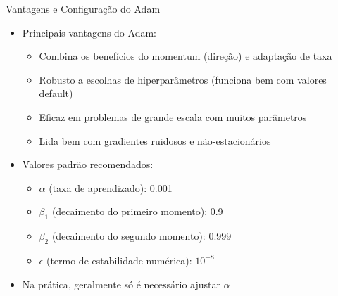 \documentclass[aspectratio=1610]{beamer}
\begin{document}
\begin{frame}{Vantagens e Configuração do Adam}
\begin{itemize}
    \item Principais vantagens do Adam: \pause
    \begin{itemize}
        \item Combina os benefícios do momentum (direção) e adaptação de taxa \pause
        \item Robusto a escolhas de hiperparâmetros (funciona bem com valores default) \pause
        \item Eficaz em problemas de grande escala com muitos parâmetros \pause
        \item Lida bem com gradientes ruidosos e não-estacionários
    \end{itemize} \pause
    \item Valores padrão recomendados: \pause
    \begin{itemize}
        \item $\alpha$ (taxa de aprendizado): 0.001 \pause
        \item $\beta_1$ (decaimento do primeiro momento): 0.9 \pause
        \item $\beta_2$ (decaimento do segundo momento): 0.999 \pause
        \item $\epsilon$ (termo de estabilidade numérica): $10^{-8}$
    \end{itemize} \pause
    \item Na prática, geralmente só é necessário ajustar $\alpha$
\end{itemize}
\end{frame}
\end{document}
